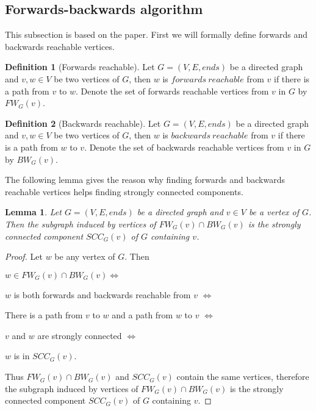 \documentclass{report}
\theoremstyle{plain}
\newtheorem{lemma}{Lemma}
\theoremstyle{definition}
\newtheorem{definition}{Definition}
\theoremstyle{remark}
\numberwithin{definition}{chapter}
\numberwithin{example}{chapter}
\numberwithin{figure}{chapter}
\numberwithin{theorem}{chapter}
\numberwithin{lemma}{chapter}
\begin{document}
\subsection{Forwards-backwards algorithm}

This subsection is based on the paper\cite{fleischer2000identifying}. First we will formally define forwards and backwards reachable vertices. 

\begin{definition}[Forwards reachable]
Let $G=(V, E, ends)$ be a directed graph and $v,w \in V$ be two vertices of $G$, then $w$ is $forwards \ reachable$ from $v$ if there is a path from $v$ to $w$. Denote the set of forwards reachable vertices from $v$ in $G$ by $FW_G(v)$.
\end{definition}

\begin{definition}[Backwards reachable]
Let $G=(V, E, ends)$ be a directed graph and $v,w \in V$ be two vertices of $G$, then $w$ is $backwards \ reachable$ from $v$ if there is a path from $w$ to $v$. Denote the set of backwards reachable vertices from $v$ in $G$ by $BW_G(v)$.
\end{definition}

The following lemma gives the reason why finding forwards and backwards reachable vertices helps finding strongly connected components.

\begin{lemma}
Let $G=(V, E, ends)$ be a directed graph and $v \in V$ be a vertex of $G$. Then the subgraph induced by vertices of $FW_G(v) \cap BW_G(v)$ is the strongly connected component $SCC_G(v)$ of $G$ containing $v$.
\label{fw_bw_l1}
\end{lemma}

\begin{proof}
Let $w$ be any vertex of $G$. Then

$w \in FW_G(v) \cap BW_G(v) \Leftrightarrow$

$w$ is both forwards and backwards reachable from $v$ $\Leftrightarrow$

There is a path from $v$ to $w$ and a path from $w$ to $v$ $\Leftrightarrow$

$v$ and $w$ are strongly connected $\Leftrightarrow$

$w$ is in  $SCC_G(v)$.

Thus $FW_G(v) \cap BW_G(v)$ and $SCC_G(v)$ contain the same vertices, therefore the subgraph induced by vertices of $FW_G(v) \cap BW_G(v)$ is the strongly connected component $SCC_G(v)$ of $G$ containing $v$. 
\end{proof}
\end{document}
